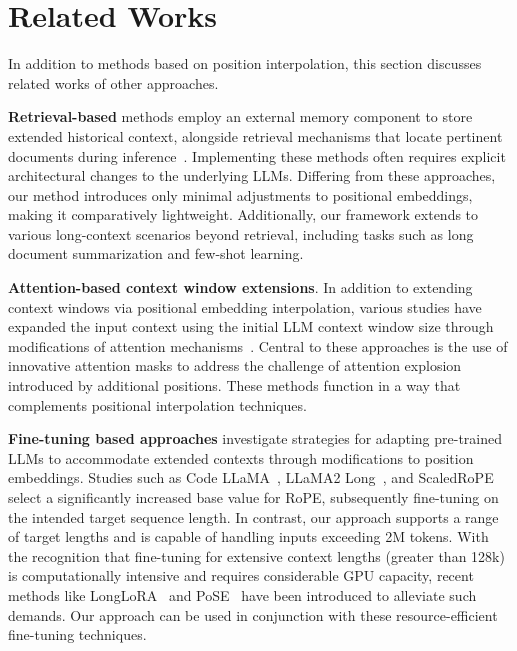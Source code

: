 \section{Related Works}

In addition to methods based on position interpolation, this section discusses related works of other approaches. 

\textbf{Retrieval-based} methods employ an external memory component to store extended historical context, alongside retrieval mechanisms that locate pertinent documents during inference~\cite{longllama,wang2023augmenting,borgeaud2022improving}. Implementing these methods often requires explicit architectural changes to the underlying LLMs. Differing from these approaches, our method introduces only minimal adjustments to positional embeddings, making it comparatively lightweight. Additionally, our framework extends to various long-context scenarios beyond retrieval, including tasks such as long document summarization and few-shot learning.

\textbf{Attention-based context window extensions}. In addition to extending context windows via positional embedding interpolation, various studies have expanded the input context using the initial LLM context window size through modifications of attention mechanisms~\cite{han2023lminfinite, streamingllm,parallelwindow}. Central to these approaches is the use of innovative attention masks to address the challenge of attention explosion introduced by additional positions. These methods function in a way that complements positional interpolation techniques.

\textbf{Fine-tuning based approaches} investigate strategies for adapting pre-trained LLMs to accommodate extended contexts through modifications to position embeddings. Studies such as Code LLaMA~\cite{codellama}, LLaMA2 Long~\cite{xiong2023effective}, and ScaledRoPE~\cite{liu2023scaling} select a significantly increased base value for RoPE, subsequently fine-tuning on the intended target sequence length. In contrast, our approach supports a range of target lengths and is capable of handling inputs exceeding 2M tokens. With the recognition that fine-tuning for extensive context lengths (greater than 128k) is computationally intensive and requires considerable GPU capacity, recent methods like LongLoRA~\cite{longlora} and PoSE~\cite{zhu2023pose} have been introduced to alleviate such demands. Our approach can be used in conjunction with these resource-efficient fine-tuning techniques.

